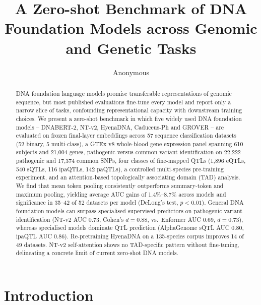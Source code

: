 \documentclass[11pt,a4paper]{article}
\title{A Zero-shot Benchmark of DNA Foundation Models across Genomic and Genetic Tasks}
\author{Anonymous}
\date{}
\begin{document}
\maketitle

\begin{abstract}
\noindent DNA foundation language models promise transferable representations of genomic sequence, but most published evaluations fine-tune every model and report only a narrow slice of tasks, confounding representational capacity with downstream training choices. We present a zero-shot benchmark in which five widely used DNA foundation models -- DNABERT-2, NT-v2, HyenaDNA, Caduceus-Ph and GROVER -- are evaluated on frozen final-layer embeddings across 57 sequence classification datasets (52 binary, 5 multi-class), a GTEx v8 whole-blood gene expression panel spanning 610 subjects and 21{,}004 genes, pathogenic-versus-common variant identification on 22{,}222 pathogenic and 17{,}374 common SNPs, four classes of fine-mapped QTLs (1{,}896 eQTLs, 540 sQTLs, 116 ipaQTLs, 142 paQTLs), a controlled multi-species pre-training experiment, and an attention-based topologically associating domain (TAD) analysis. We find that mean token pooling consistently outperforms summary-token and maximum pooling, yielding average AUC gains of 1.4\%--8.7\% across models and significance in 35--42 of 52 datasets per model (DeLong's test, $p<0.01$). General DNA foundation models can surpass specialised supervised predictors on pathogenic variant identification (NT-v2 AUC 0.73, Cohen's $d=0.88$, vs.\ Enformer AUC 0.69, $d=0.73$), whereas specialised models dominate QTL prediction (AlphaGenome sQTL AUC 0.80, ipaQTL AUC 0.86). Re-pretraining HyenaDNA on a 135-species corpus improves 14 of 49 datasets. NT-v2 self-attention shows no TAD-specific pattern without fine-tuning, delineating a concrete limit of current zero-shot DNA models.
\end{abstract}

\section{Introduction}
\end{document}

